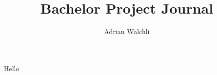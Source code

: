 \documentclass[10pt,a4paper,titlepage]{report}
\author{Adrian Wälchli}
\title{Bachelor Project Journal}
\begin{document}
Hello
\end{document}
